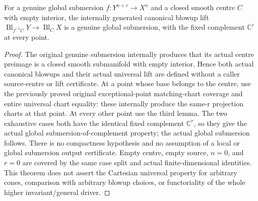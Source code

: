 \begin{theorem}
\label{hir:submersion-blowup-actual-universal-lift-global-submersion}
\leanok
{}
For a genuine global submersion $f:Y^{n+r}\to X^n$ and a closed smooth centre
$C$ with empty interior, the internally generated canonical blowup lift
$\operatorname{Bl}_{f^{-1}C}Y\to\operatorname{Bl}_C X$ is a genuine global
submersion, with the fixed complement $\mathbb C^r$ at every point.
\end{theorem}
\begin{proof}
The original genuine submersion internally produces that its actual centre
preimage is a closed smooth submanifold with empty interior. Hence both actual
canonical blowups and their actual universal lift are defined without a caller
source-centre or lift certificate. At a point whose base belongs to the centre,
use the previously proved original exceptional-point matching-chart coverage
and entire universal chart equality: these internally produce the same-r
projection charts at that point. At every other point use the third lemma.
The two exhaustive cases both have the identical fixed complement
$\mathbb C^r$, so they give the actual global submersion-of-complement property;
the actual global submersion follows. There is no compactness hypothesis and
no assumption of a local or global submersion output certificate. Empty centre,
empty source, $n=0$, and $r=0$ are covered by the same case split and actual
finite-dimensional identities. This theorem does not assert the Cartesian
universal property for arbitrary cones, comparison with arbitrary blowup
choices, or functoriality of the whole higher invariant/general driver.
\end{proof}
